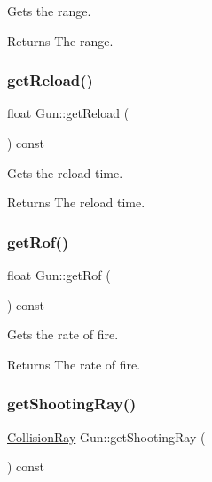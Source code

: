 Gets the range. 

\begin{DoxyReturn}{Returns}
The range. 
\end{DoxyReturn}
\mbox{\label{class_gun_a32315eb4c4893cb6aaf34945be1e10d9}} 
\subsubsection{\texorpdfstring{getReload()}{getReload()}}
{\footnotesize\ttfamily float Gun\+::get\+Reload (\begin{DoxyParamCaption}{ }\end{DoxyParamCaption}) const\hspace{0.3cm}{\ttfamily [inline]}}



Gets the reload time. 

\begin{DoxyReturn}{Returns}
The reload time. 
\end{DoxyReturn}
\mbox{\label{class_gun_a675a9dabf30c40a19c43364a5fa0e03b}} 
\subsubsection{\texorpdfstring{getRof()}{getRof()}}
{\footnotesize\ttfamily float Gun\+::get\+Rof (\begin{DoxyParamCaption}{ }\end{DoxyParamCaption}) const\hspace{0.3cm}{\ttfamily [inline]}}



Gets the rate of fire. 

\begin{DoxyReturn}{Returns}
The rate of fire. 
\end{DoxyReturn}
\mbox{\label{class_gun_add9d24776b386d2cbc934e7fcff4ecf8}} 
\subsubsection{\texorpdfstring{getShootingRay()}{getShootingRay()}}
{\footnotesize\ttfamily \mbox{\hyperlink{class_collision_ray}{Collision\+Ray}} Gun\+::get\+Shooting\+Ray (\begin{DoxyParamCaption}{ }\end{DoxyParamCaption}) const}



